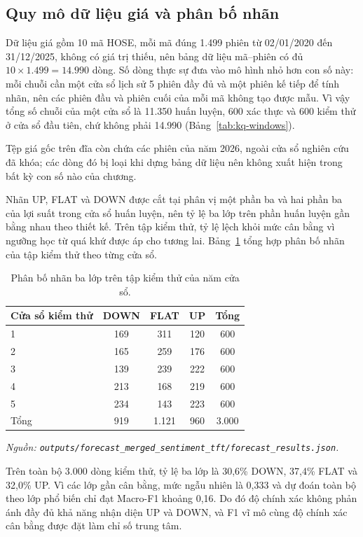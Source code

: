 \subsection{Quy mô dữ liệu giá và phân bố nhãn}

Dữ liệu giá gồm 10 mã HOSE, mỗi mã đúng 1.499 phiên từ 02/01/2020 đến 31/12/2025, không
có giá trị thiếu, nên bảng dữ liệu mã--phiên có đủ $10 \times 1.499 = 14.990$ dòng. Số dòng
thực sự đưa vào mô hình nhỏ hơn con số này: mỗi chuỗi cần một cửa sổ lịch sử 5 phiên đầy đủ
và một phiên kế tiếp để tính nhãn, nên các phiên đầu và phiên cuối của mỗi mã không tạo được
mẫu. Vì vậy tổng số chuỗi của một cửa sổ là 11.350 huấn luyện, 600 xác thực và 600 kiểm thử
ở cửa sổ đầu tiên, chứ không phải 14.990 (Bảng~\ref{tab:kq-windows}).

Tệp giá gốc trên đĩa còn chứa các phiên của năm 2026, ngoài cửa sổ nghiên cứu đã khóa; các
dòng đó bị loại khi dựng bảng dữ liệu nên không xuất hiện trong bất kỳ con số nào của
chương.

Nhãn UP, FLAT và DOWN được cắt tại phân vị một phần ba và hai phần ba của lợi suất trong
cửa sổ huấn luyện, nên tỷ lệ ba lớp trên phần huấn luyện gần bằng nhau theo thiết kế. Trên
tập kiểm thử, tỷ lệ lệch khỏi mức cân bằng vì ngưỡng học từ quá khứ được áp cho tương lai.
Bảng~\ref{tab:kq-price-stats} tổng hợp phân bố nhãn của tập kiểm thử theo từng cửa sổ.

\begin{table}[H]
  \centering
  \caption{Phân bố nhãn ba lớp trên tập kiểm thử của năm cửa sổ.}
  \label{tab:kq-price-stats}
  \begin{tabular}{p{4.5cm} c c c c}
    \toprule
    Cửa sổ kiểm thử & DOWN & FLAT & UP & Tổng \\
    \midrule
    1 & 169 & 311 & 120 & 600 \\
    2 & 165 & 259 & 176 & 600 \\
    3 & 139 & 239 & 222 & 600 \\
    4 & 213 & 168 & 219 & 600 \\
    5 & 234 & 143 & 223 & 600 \\
    \midrule
    Tổng & 919 & 1.121 & 960 & 3.000 \\
    \bottomrule
  \end{tabular}
\noindent\textit{Nguồn: \texttt{outputs/forecast\_merged\_sentiment\_tft/forecast\_results.json}.}
\end{table}

Trên toàn bộ 3.000 dòng kiểm thử, tỷ lệ ba lớp là 30,6\% DOWN, 37,4\% FLAT và 32,0\% UP.
Vì các lớp gần cân bằng, mức ngẫu nhiên là 0,333 và dự đoán toàn bộ theo lớp phổ biến chỉ
đạt Macro-F1 khoảng 0,16. Do đó độ chính xác không phản ánh đầy đủ khả năng nhận diện UP và
DOWN, và F1 vĩ mô cùng độ chính xác cân bằng được đặt làm chỉ số trung tâm.

